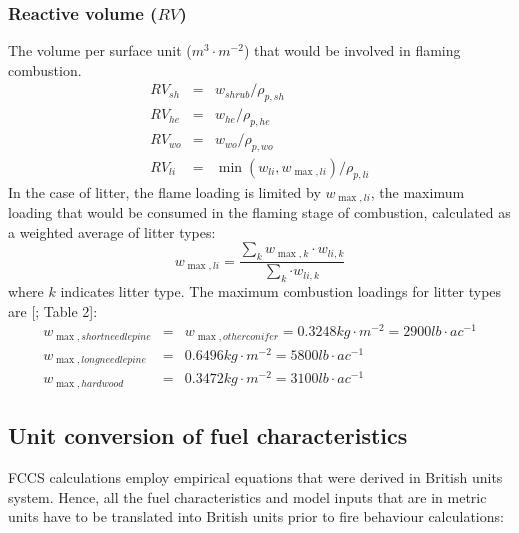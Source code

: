 \documentclass[]{book}
\begin{document}
\hypertarget{reactive-volume-rv}{%
\subsubsection{\texorpdfstring{Reactive volume (\(RV\))}{Reactive volume (RV)}}\label{reactive-volume-rv}}

The volume per surface unit (\(m^3\cdot m^{-2}\)) that would be involved in flaming combustion.
\begin{eqnarray}
RV_{sh} &=& w_{shrub}/\rho_{p, sh}\\
RV_{he} &=& w_{he}/\rho_{p, he}\\
RV_{wo} &=& w_{wo}/\rho_{p, wo}\\
RV_{li} &=& \min(w_{li}, w_{\max,li})/\rho_{p, li}
\end{eqnarray}
In the case of litter, the flame loading is limited by \(w_{\max,li}\), the maximum loading that would be consumed in the flaming stage of combustion, calculated as a weighted average of litter types:
\begin{equation}
 w_{\max,li} = \frac{\sum_{k}{ w_{\max,k}\cdot w_{li,k}}}{\sum_{k} {\cdot w_{li,k}}}
\end{equation}
where \(k\) indicates litter type. The maximum combustion loadings for litter types are {[}\citet{Prichard2013}; Table 2{]}:
\begin{eqnarray}
w_{\max,shortneedlepine} &=& w_{\max,otherconifer} = 0.3248 kg \cdot m^{-2} = 2900 lb\cdot ac^{-1} \\
w_{\max,longneedlepine} &=& 0.6496 kg \cdot m^{-2}= 5800 lb\cdot ac^{-1} \\
w_{\max,hardwood} &=& 0.3472 kg \cdot m^{-2}= 3100 lb\cdot ac^{-1} 
\end{eqnarray}

\hypertarget{unit-conversion-of-fuel-characteristics}{%
\subsection{Unit conversion of fuel characteristics}\label{unit-conversion-of-fuel-characteristics}}

FCCS calculations employ empirical equations that were derived in British units system. Hence, all the fuel characteristics and model inputs that are in metric units have to be translated into British units prior to fire behaviour calculations:
\end{document}
